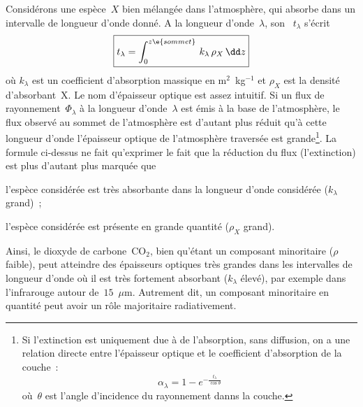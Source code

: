 \sk
Considérons une espèce~$X$ bien mélangée dans l'atmosphère, qui absorbe dans un intervalle de longueur d'onde donné. A la longueur d'onde~$\lambda$, son ~$t_\lambda$ s'écrit
\[ \boxed{ t_\lambda = \int_{0}^{z\e{sommet}} \, k_\lambda \, \rho_X \, \dd z } \]
où $k_\lambda$ est un coefficient d'absorption massique en m$^2$~kg$^{-1}$ et $\rho_X$ est la densité d'absorbant~X. Le nom d'épaisseur optique est assez intuitif. Si un flux de rayonnement~$\Phi_\lambda$ à la longueur d'onde~$\lambda$ est émis à la base de l'atmosphère, le flux observé au sommet de l'atmosphère est d'autant plus réduit qu'à cette longueur d'onde l'épaisseur optique de l'atmosphère traversée est grande\footnote{Si l'extinction est uniquement due à de l'absorption, sans diffusion, on a une relation directe entre l'épaisseur optique et le coefficient d'absorption de la couche~: 
\[\alpha_\lambda = 1 - e^{- \frac{t_\lambda}{\cos\theta}} \] où~$\theta$ est l'angle d'incidence du rayonnement danns la couche.}. La formule ci-dessus ne fait qu'exprimer le fait que la réduction du flux (l'extinction) est plus d'autant plus marquée que 
\begin{citemize}
\item l'espèce considérée est très absorbante dans la longueur d'onde considérée ($k_\lambda$ grand)~;
\item l'espèce considérée est présente en grande quantité ($\rho_X$ grand).
\end{citemize}
Ainsi, le dioxyde de carbone~CO$_2$, bien qu'étant un composant minoritaire ($\rho$ faible), peut atteindre des épaisseurs optiques très grandes dans les intervalles de longueur d'onde où il est très fortement absorbant ($k_\lambda$ élevé), par exemple dans l'infrarouge autour de~$15$~$\mu$m. Autrement dit, un composant minoritaire en quantité peut avoir un rôle majoritaire radiativement.

